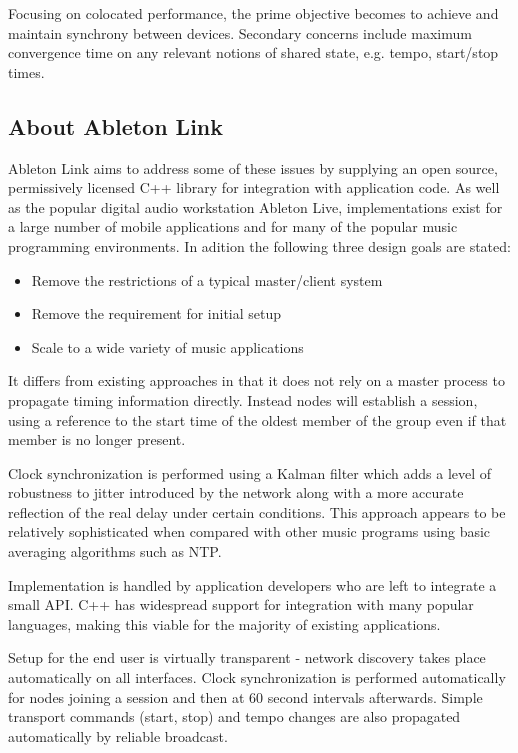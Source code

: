 \documentclass[11pt]{article} %
\theoremstyle{plain}
\theoremstyle{definition}
\begin{document}
Focusing on colocated performance, the prime objective becomes to achieve and
maintain synchrony between devices. Secondary concerns include maximum
convergence time on any relevant notions of shared state, e.g. tempo,
start/stop times.

\subsection{About Ableton Link}

Ableton Link aims to address some of these issues by supplying an open source,
permissively licensed C++ library for integration with application code. As
well as the popular digital audio workstation Ableton Live, implementations
exist for a large number of mobile applications and for many of the popular
music programming environments. In adition the following three design goals are
stated\cite{goltz2018ableton}:

\begin{itemize}
  \item Remove the restrictions of a typical master/client system
  \item Remove the requirement for initial setup
  \item Scale to a wide variety of music applications
\end{itemize}

It differs from existing approaches in that it does not rely on a master
process to propagate timing information directly. Instead nodes will establish
a session, using a reference to the start time of the oldest member of the
group even if that member is no longer present.

Clock synchronization is performed using a Kalman
filter\cite{bletsas2005evaluation} which adds a level of robustness to jitter
introduced by the network along with a more accurate reflection of the real
delay under certain conditions. This approach appears to be relatively
sophisticated when compared with other music programs using basic averaging
algorithms such as NTP.

Implementation is handled by application developers who are left to integrate a
small API. C++ has widespread support for integration with many popular
languages, making this viable for the majority of existing applications.

Setup for the end user is virtually transparent - network discovery takes place
automatically on all interfaces. Clock synchronization is performed
automatically for nodes joining a session and then at 60 second intervals
afterwards. Simple transport commands (start, stop) and tempo changes are also
propagated automatically by reliable broadcast.
\end{document}
